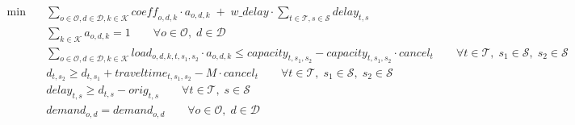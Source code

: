 \begin{align}
  \min\quad & \sum_{o \in \mathcal{O}, d \in \mathcal{D}, k \in \mathcal{K}} \mathit{coeff}_{o,d,k} \cdot a_{o,d,k}
               \;+\; w\_delay \cdot \sum_{t \in \mathcal{T}, s \in \mathcal{S}} delay_{t,s} \tag{gen\_travel} \\[4pt]
  & \sum_{k \in \mathcal{K}} a_{o,d,k} = 1 \qquad \forall o \in \mathcal{O},\; d \in \mathcal{D} \tag{assign\_one\_per\_od} \\[4pt]
  & \sum_{o \in \mathcal{O}, d \in \mathcal{D}, k \in \mathcal{K}} \mathit{load}_{o,d,k,t,s_1,s_2} \cdot a_{o,d,k}
      \le \mathit{capacity}_{t,s_1,s_2} - \mathit{capacity}_{t,s_1,s_2} \cdot cancel_{t}
      \qquad \forall t \in \mathcal{T},\; s_1 \in \mathcal{S},\; s_2 \in \mathcal{S} \tag{capacity\_limit} \\[4pt]
  & d_{t,s_2} \ge d_{t,s_1} + \mathit{traveltime}_{t,s_1,s_2} - M \cdot cancel_{t}
      \qquad \forall t \in \mathcal{T},\; s_1 \in \mathcal{S},\; s_2 \in \mathcal{S} \tag{time\_consistency} \\[4pt]
  & delay_{t,s} \ge d_{t,s} - \mathit{orig}_{t,s}
      \qquad \forall t \in \mathcal{T},\; s \in \mathcal{S} \tag{delay\_def} \\[4pt]
  & demand_{o,d} = demand_{o,d}
      \qquad \forall o \in \mathcal{O},\; d \in \mathcal{D} \tag{demand\_used}
\end{align}